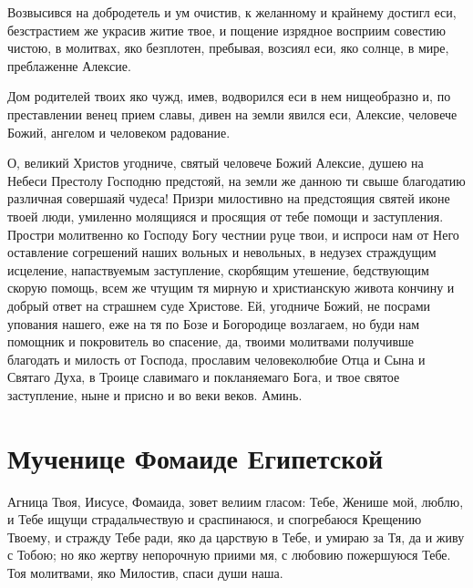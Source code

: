 

Возвысився на добродетель и ум очистив, к желанному и крайнему достигл еси, безстрастием же украсив житие твое, и пощение изрядное восприим совестию чистою, в молитвах, яко безплотен, пребывая, возсиял еси, яко солнце, в мире, преблаженне Алексие.




Дом родителей твоих яко чужд, имев, водворился еси в нем нищеобразно и, по преставлении венец прием славы, дивен на земли явился еси, Алексие, человече Божий, ангелом и человеком радование.




О, великий Христов угодниче, святый человече Божий Алексие, душею на Небеси Престолу Господню предстояй, на земли же данною ти свыше благодатию различная совершаяй чудеса! Призри милостивно на предстоящия святей иконе твоей люди, умиленно молящияся и просящия от тебе помощи и заступления. Простри молитвенно ко Господу Богу честнии руце твои, и испроси нам от Него оставление согрешений наших вольных и невольных, в недузех страждущим исцеление, напаствуемым заступление, скорбящим утешение, бедствующим скорую помощь, всем же чтущим тя мирную и христианскую живота кончину и добрый ответ на страшнем суде Христове. Ей, угодниче Божий, не посрами упования нашего, еже на тя по Бозе и Богородице возлагаем, но буди нам помощник и покровитель во спасение, да, твоими молитвами получивше благодать и милость от Господа, прославим человеколюбие Отца и Сына и Святаго Духа, в Троице славимаго и покланяемаго Бога, и твое святое заступление, ныне и присно и во веки веков. Аминь.
\mychapterending


 

\section{Мученице Фомаиде Египетской}
 



 Агница Твоя, Иисусе, Фомаида, зовет велиим гласом: Тебе, Женише мой, люблю, и Тебе ищущи страдальчествую и сраспинаюся, и спогребаюся Крещению Твоему, и стражду Тебе ради, яко да царствую в Тебе, и умираю за Тя, да и живу с Тобою; но яко жертву непорочную приими мя, с любовию пожершуюся Тебе. Тоя молитвами, яко Милостив, спаси души наша.


